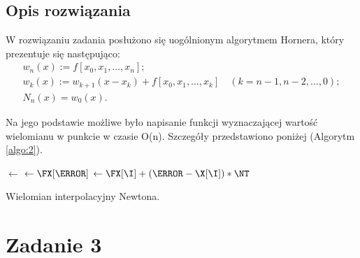 \documentclass{classrep}
\begin{document}
	\subsection{Opis rozwiązania}	
		W rozwiązaniu zadania posłużono się uogólnionym algorytmem Hornera, który prezentuje się następująco:
		$$\begin{aligned}
			&w_n(x) := f[x_0, x_1, \ldots, x_n];&\\
			&w_k(x) := w_{k+1}(x-x_k)+ f[x_0, x_1, \ldots, x_k]	\quad(k=n-1, n-2, \ldots, 0);&\\
			&N_n(x) = w_0(x).
		\end{aligned}$$
		
		Na jego podstawie możliwe było napisanie funkcji wyznaczającej wartość wielomianu w punkcie w czasie O(n).
		Szczegóły przedstawiono poniżej (Algorytm \ref{algo:2}).
	
		\begin{algorithm}[!htbp]

		    	
    			\Fun{\F{\X, \FX, \T}} {
		    		\N $\gets$ \LEN{\FX}\;
		    		\NT $\gets \FX[\N]$\;
		    		 {
		    			\NT $\gets \FX[\I] + (\T - \X[\I]) * \NT$\; 		
		    		}
		    		\KwRet \NT\;
    			}
    			\caption{Wielomian interpolacyjny Newtona.}
    			\label{algo:2}
		\end{algorithm}	

\section{Zadanie 3}
\end{document}
